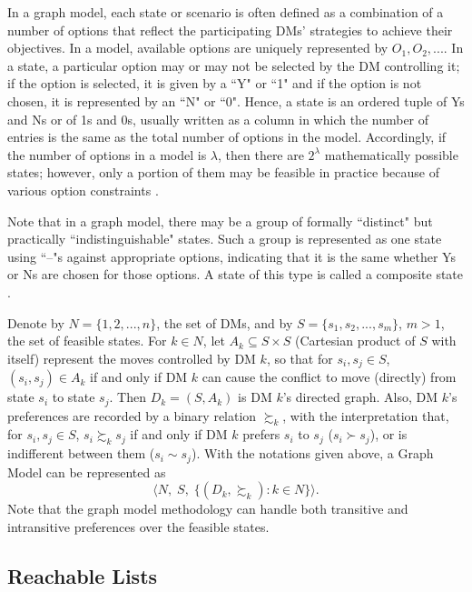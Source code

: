 In a graph model, each state or scenario is often defined as a combination of a number of options that reflect the participating DMs' strategies to achieve their objectives. In a model, available options are uniquely represented by $O_1, O_2, ...$. In a state, a particular option may or may not be selected by the DM controlling it; if the option is selected, it is given by a ``Y" or ``1" and if the option is not chosen, it is represented by an ``N" or ``0". Hence, a state is an ordered tuple of Ys and Ns or of 1s and 0s, usually written as a column in which the number of entries is the same as the total number of options in the model. Accordingly, if the number of options in a model is $\lambda$, then there are $2^\lambda$ mathematically possible states; however, only a portion of them may be feasible in practice because of various option constraints \citep{Fang-et-al1993, Peng1999, Fang-et-al2003}.

Note that in a graph model, there may be a group of formally ``distinct" but practically ``indistinguishable" states. Such a group is represented as one state using ``--"s against appropriate options, indicating that it is the same whether Ys or Ns are chosen for those options. A state of this type is called a composite state \citep{Fang-et-al1993, Peng1999, Fang-et-al2003}.

Denote by $N = \{1, 2, ..., n\}$, the set of DMs, and by $S = \{s_1, s_2, ..., s_m\}$, $m>1$, the set of feasible states. For $k \in N$, let $A_k \subseteq S \times S$ (Cartesian product of $S$ with itself) represent the moves controlled by DM $k$, so that for $s_i, s_j \in S$, $(s_i, s_j) \in A_k$ if and only if DM $k$ can cause the conflict to move (directly) from state $s_i$ to state $s_j$. Then $D_k=(S, A_k)$ is DM $k$'s directed graph. Also, DM $k$'s preferences are recorded by a binary relation $\succsim_k$, with the interpretation that, for $s_i, s_j \in S$, $s_i \succsim_k s_j$ if and only if DM $k$ prefers $s_i$ to $s_j$ ($s_i \succ s_j$), or is indifferent between them ($s_i \sim s_j$). With the notations given above, a Graph Model can be represented as
$$\langle N,\; S,\; \{(D_k, \succsim_k) : k \in N\} \rangle.$$
Note that the graph model methodology can handle both transitive and intransitive preferences over the feasible states.

\subsection{Reachable Lists}

